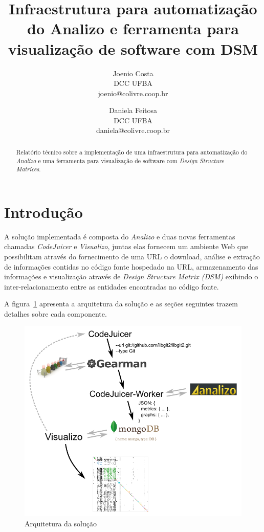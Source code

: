 \documentclass[conference]{IEEEtran}
\title{Infraestrutura para automatização do Analizo e ferramenta para
  visualização de software com DSM}
\author{
  Joenio Costa\\
  DCC UFBA\\
  joenio@colivre.coop.br
  \and
  Daniela Feitosa\\
  DCC UFBA\\
  daniela@colivre.coop.br
}
\begin{document}
\maketitle

\begin{abstract}
  Relatório técnico sobre a implementação de uma infraestrutura para
  automatização do {\it Analizo} e uma ferramenta para visualização de
  software com {\it Design Structure Matrices}.
\end{abstract}

\section{Introdução}

A solução implementada é composta do {\it Analizo}\cite{Analizo} e duas novas
ferramentas chamadas {\it CodeJuicer} e {\it Visualizo}, juntas elas fornecem
um ambiente Web que possibilitam através do fornecimento de uma URL o
download, análise e extração de informações contidas no código fonte hospedado
na URL, armazenamento das informações e visualização através de {\it Design
Structure Matrix (DSM)}\cite{ExploringStructure} exibindo o
inter-relacionamento entre as entidades encontradas no código fonte.

A figura~\ref{fig:design-da-solucao} apresenta a arquitetura da solução e as
seções seguintes trazem detalhes sobre cada componente.

\begin{figure}[h]
\center
\includegraphics[scale=0.3]{design-da-solucao.png}
\caption{Arquitetura da solução}
\label{fig:design-da-solucao}
\end{figure}
\end{document}
